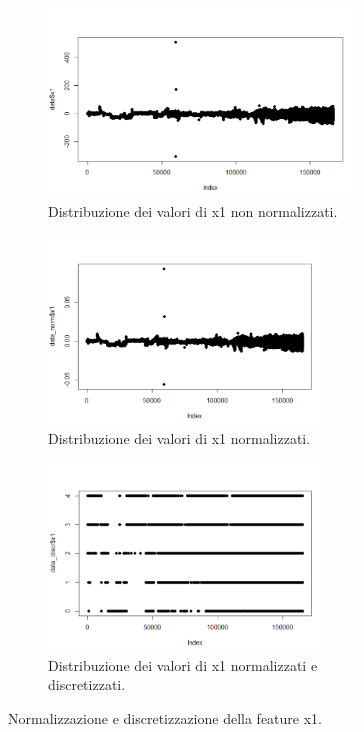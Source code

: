 \documentclass[12pt]{article}
\begin{document}
\begin{figure}[h]
	
	\begin{subfigure}{0.5\textwidth}
		\includegraphics[width=0.9\linewidth, height=5cm]{images/x1notnormalize.PNG} 
		\caption{Distribuzione dei valori di x1 non normalizzati.}
		\label{fig:x1nonNormalize}
	\end{subfigure}
	\begin{subfigure}{0.5\textwidth}
		\includegraphics[width=0.9\linewidth, height=5cm]{images/x1normalize.PNG}
		\caption{Distribuzione dei valori di x1 normalizzati.}
		\label{fig:subim2}
	\end{subfigure}
	\begin{subfigure}{0.5\textwidth}
		\includegraphics[width=0.9\linewidth, height=5cm]{images/x1discretize.PNG}
		\caption{Distribuzione dei valori di x1 normalizzati e discretizzati.}
		\label{fig:subim2}
	\end{subfigure}
	\caption{Normalizzazione e discretizzazione della feature x1.}
	\label{fig:x1}
\end{figure}
\end{document}
